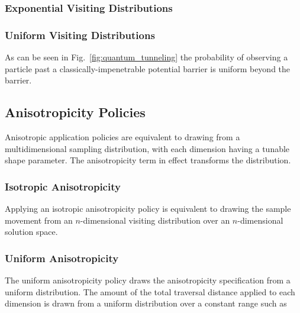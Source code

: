 \documentclass[11pt]{afthesis}
\begin{document}
	
	\subsubsection{Exponential Visiting Distributions}
	
	
	
	\subsubsection{Uniform Visiting Distributions}
	
	As can be seen in Fig.~\ref{fig:quantum_tunneling} the probability of observing a particle past a classically-impenetrable potential barrier is uniform beyond the barrier. 

	\subsection{Anisotropicity Policies}
	
	
	
	Anisotropic application policies are equivalent to drawing from a multidimensional sampling distribution, with each dimension having a tunable shape parameter. The anisotropicity term in effect transforms the distribution.
	
	\subsubsection{Isotropic Anisotropicity}
	
	
	Applying an isotropic anisotropicity policy is equivalent to drawing the sample movement from an \begin{math}n\end{math}-dimensional visiting distribution over an \begin{math}n\end{math}-dimensional solution space.
	
	\subsubsection{Uniform Anisotropicity}
	
	The uniform anisotropicity policy draws the anisotropicity specification from a uniform distribution. The amount of the total traversal distance applied to each dimension is drawn from a uniform distribution over a constant range such as \begin{math}[0,1]\end{math}
	
\end{document}
